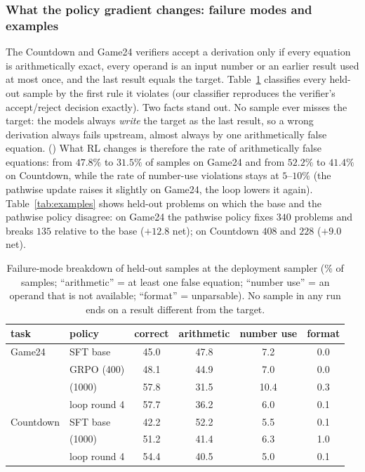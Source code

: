 \fi


\iffalse
\subsubsection{What the policy gradient changes: failure modes and examples}
\label{app:failure_modes}
The Countdown and Game24 verifiers accept a derivation only if every equation is arithmetically exact, every operand is an input number or an earlier result used at most once, and the last result equals the target. Table~\ref{tab:failure_modes} classifies every held-out sample by the first rule it violates (our classifier reproduces the verifier's accept/reject decision exactly). Two facts stand out. No sample ever misses the target: the models always \emph{write} the target as the last result, so a wrong derivation always fails upstream, almost always by one arithmetically false equation. () What RL changes is therefore the rate of arithmetically false equations: from $47.8\%$ to $31.5\%$ of samples on Game24 and from $52.2\%$ to $41.4\%$ on Countdown, while the rate of number-use violations stays at $5$--$10\%$ (the pathwise update raises it slightly on Game24, the loop lowers it again). Table~\ref{tab:examples} shows held-out problems on which the base and the pathwise policy disagree: on Game24 the pathwise policy fixes $340$ problems and breaks $135$ relative to the base ($+12.8$ net); on Countdown $408$ and $228$ ($+9.0$ net).

\begin{table}[H]\centering\small
\caption{Failure-mode breakdown of held-out samples at the deployment sampler (\% of samples; ``arithmetic'' = at least one false equation; ``number use'' = an operand that is not available; ``format'' = unparsable). No sample in any run ends on a result different from the target.}\label{tab:failure_modes}
\begin{tabular}{@{}llcccc@{}}\toprule
task & policy & correct & arithmetic & number use & format\\\midrule
Game24 & SFT base & 45.0 & 47.8 & 7.2 & 0.0\\
 & GRPO (400) & 48.1 & 44.9 & 7.0 & 0.0\\
 & \methodSVGTwoD{} (1000) & 57.8 & 31.5 & 10.4 & 0.3\\
 & loop round 4 & 57.7 & 36.2 & 6.0 & 0.1\\\midrule
Countdown & SFT base & 42.2 & 52.2 & 5.5 & 0.1\\
 & \methodSVGScalar{} (1000) & 51.2 & 41.4 & 6.3 & 1.0\\
 & loop round 4 & 54.4 & 40.5 & 5.0 & 0.1\\\bottomrule\end{tabular}\end{table}

